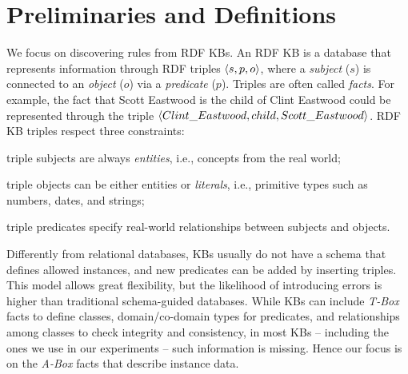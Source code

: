 \vspace{-0.5ex}
\section{Preliminaries and Definitions} \label{sec:krd_prel}
We focus on discovering rules from RDF KBs. An RDF KB is
a database that represents information through RDF triples $\langle s,p,o\rangle$, where a \emph{subject} ($s$) is connected to an \emph{object} ($o$) via a \emph{predicate} ($p$). Triples are often called \emph{facts}. For example, the fact that Scott Eastwood is the child of Clint Eastwood could be represented through the triple $\langle Clint\_Eastwood,child,Scott\_Eastwood\rangle$. 
RDF KB triples respect three constraints:
\begin{inparaenum}[(i)]
	\item triple subjects are always \emph{entities}, i.e., concepts from the real world;
	\item triple objects can be either entities or \emph{literals}, i.e.,  primitive types such as numbers, dates, and strings;
	\item triple predicates specify real-world relationships between subjects and objects.
\end{inparaenum}

Differently from relational databases, KBs usually do not have a schema that defines allowed instances,
and new predicates can be added by inserting triples. %
This model allows great flexibility, but the likelihood of introducing errors is higher than traditional schema-guided databases.
While KBs can include \emph{T-Box} facts to define classes, domain/co-domain types for predicates, and relationships among classes
to check integrity and consistency, in most KBs -- including the ones we use in our experiments -- such information is missing. %
Hence our focus is on the \emph{A-Box} facts that describe instance data. 

\vspace{-1ex}
